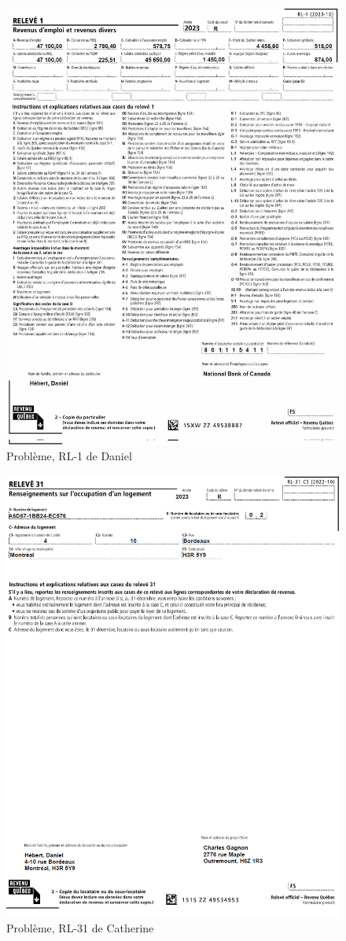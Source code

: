 \begin{figure}
	\centering
	\includegraphics[width=.9\textwidth]{probleme/chapitre-4/Daniel-RL1.png}
	\caption{Problème, RL-1 de Daniel}
	\label{fig:chap4ProblemeDanielRL1}
\end{figure}
\begin{figure}
	\centering
	\includegraphics[width=.9\textwidth]{probleme/chapitre-4/Daniel-RL31.png}
	\caption{Problème, RL-31 de Catherine}
	\label{fig:chap4ProblemeCatherineRL31}
\end{figure}
